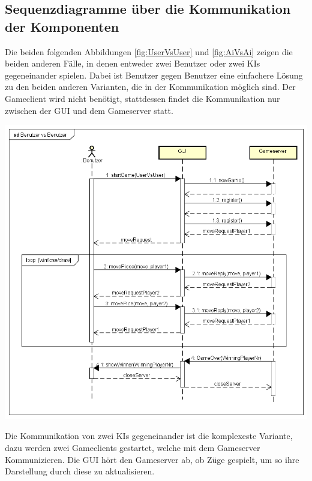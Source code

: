 \documentclass[12pt,a4paper,bibliography=totocnumbered,listof=totocnumbered]{article}
\begin{document}
\begin{appendix}
\section{Sequenzdiagramme über die Kommunikation der Komponenten}
\label{apx:KommunikationDerKomp}
Die beiden folgenden Abbildungen \ref{fig:UserVsUser} und \ref{fig:AiVsAi} zeigen die beiden anderen Fälle, in 
denen entweder zwei Benutzer oder zwei KIs gegeneinander spielen. Dabei ist Benutzer gegen Benutzer eine einfachere Lösung zu den beiden anderen Varianten, die 
in der Kommunikation möglich sind. Der Gameclient wird nicht benötigt, stattdessen findet die Kommunikation nur zwischen der GUI und dem Gameserver statt.

\vspace{1em}
\begin{minipage}{\linewidth}
	\centering
	\includegraphics[width=1.0\linewidth]{pics/SequenceDiagramBenutzervsBenutzer.png}
    \label{fig:UserVsUser}
\end{minipage}

Die Kommunikation von zwei KIs gegeneinander ist die komplexeste Variante, dazu werden zwei Gameclients gestartet, welche mit dem Gameserver 
Kommunizieren. Die GUI hört den Gameserver ab, ob Züge gespielt, um so ihre Darstellung durch diese zu aktualisieren.


\end{appendix}
\end{document}
